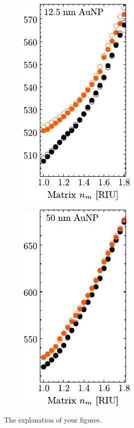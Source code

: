\begin{figure}[h!]
%
	\hspace*{-.5em}\begin{subfigure}{.05\textwidth}\vspace{-6.35cm}\caption{}\label{sfig:secondaty2}	\end{subfigure}
	\hspace*{-2.45em}
	\begin{subfigure}{.24\textwidth} \includegraphics[scale = 1.02]{1-Theory/figs/redShift_mat1.pdf}\end{subfigure}%
%
	\hspace*{-.45em}\begin{subfigure}{.05\textwidth}\vspace{-6.35cm}\caption{}\label{sfig:secondaty2}	\end{subfigure}
	\hspace*{-2.45em}
	\begin{subfigure}{.24\textwidth} \includegraphics[scale = 1.02]{1-Theory/figs/redShift_mat2.pdf}\end{subfigure}%
\vspace*{-.5em}
\caption[Example of Figure title]{The explanation of your figures. \blindtext}
\label{fig:Main}
\end{figure}
